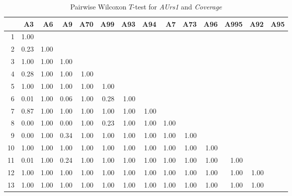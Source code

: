 \begin{table}[ht]
	\small
	\centering
	\begin{tabular}{rrrrrrrrrrrrrr}
		\toprule
		& A3 & A6 & A9 & A70 & A99 & A93 & A94 & A7 & A73 & A96 & A995 & A92 & A95 \\ 
		\midrule
		1 & 1.00 &  &  &  &  &  &  &  &  &  &  &  &  \\ 
		2 & 0.23 & 1.00 &  &  &  &  &  &  &  &  &  &  &  \\ 
		3 & 1.00 & 1.00 & 1.00 &  &  &  &  &  &  &  &  &  &  \\ 
		4 & 0.28 & 1.00 & 1.00 & 1.00 &  &  &  &  &  &  &  &  &  \\ 
		5 & 1.00 & 1.00 & 1.00 & 1.00 & 1.00 &  &  &  &  &  &  &  &  \\ 
		6 & 0.01 & 1.00 & 0.06 & 1.00 & 0.28 & 1.00 &  &  &  &  &  &  &  \\ 
		7 & 0.87 & 1.00 & 1.00 & 1.00 & 1.00 & 1.00 & 1.00 &  &  &  &  &  &  \\ 
		8 & 0.00 & 1.00 & 0.00 & 1.00 & 0.23 & 1.00 & 1.00 & 1.00 &  &  &  &  &  \\ 
		9 & 0.00 & 1.00 & 0.34 & 1.00 & 1.00 & 1.00 & 1.00 & 1.00 & 1.00 &  &  &  &  \\ 
		10 & 1.00 & 1.00 & 1.00 & 1.00 & 1.00 & 1.00 & 1.00 & 1.00 & 1.00 & 1.00 &  &  &  \\ 
		11 & 0.01 & 1.00 & 0.24 & 1.00 & 1.00 & 1.00 & 1.00 & 1.00 & 1.00 & 1.00 & 1.00 &  &  \\ 
		12 & 1.00 & 1.00 & 1.00 & 1.00 & 1.00 & 1.00 & 1.00 & 1.00 & 1.00 & 1.00 & 1.00 & 1.00 &  \\ 
		13 & 1.00 & 1.00 & 1.00 & 1.00 & 1.00 & 1.00 & 1.00 & 1.00 & 1.00 & 1.00 & 1.00 & 1.00 &  \\ 
		\bottomrule
	  \end{tabular}
    \caption{Pairwise Wilcoxon $T$-test for \textit{AUrs1} and \textit{Coverage}}
    \label{tbl:wilcoxon_baysis_effector_AUrs1_Cov}
\end{table}
